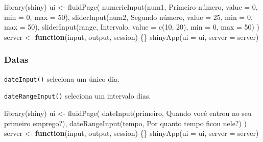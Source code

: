 \documentclass[
]{book}
\newenvironment{Shaded}{\begin{snugshade}}{\end{snugshade}}
\newcommand{\AttributeTok}[1]{\textcolor[rgb]{0.77,0.63,0.00}{#1}}
\newcommand{\ControlFlowTok}[1]{\textcolor[rgb]{0.13,0.29,0.53}{\textbf{#1}}}
\newcommand{\DecValTok}[1]{\textcolor[rgb]{0.00,0.00,0.81}{#1}}
\newcommand{\FunctionTok}[1]{\textcolor[rgb]{0.00,0.00,0.00}{#1}}
\newcommand{\NormalTok}[1]{#1}
\newcommand{\OtherTok}[1]{\textcolor[rgb]{0.56,0.35,0.01}{#1}}
\newcommand{\StringTok}[1]{\textcolor[rgb]{0.31,0.60,0.02}{#1}}
\begin{document}
\begin{Shaded}
\begin{Highlighting}[]
\FunctionTok{library}\NormalTok{(shiny)}
\NormalTok{ui }\OtherTok{\textless{}{-}} \FunctionTok{fluidPage}\NormalTok{(}
  \FunctionTok{numericInput}\NormalTok{(}\StringTok{\textquotesingle{}num1\textquotesingle{}}\NormalTok{, }\StringTok{\textquotesingle{}Primeiro número\textquotesingle{}}\NormalTok{, }\AttributeTok{value =} \DecValTok{0}\NormalTok{, }\AttributeTok{min =} \DecValTok{0}\NormalTok{, }\AttributeTok{max =} \DecValTok{50}\NormalTok{),}
  \FunctionTok{sliderInput}\NormalTok{(}\StringTok{\textquotesingle{}num2\textquotesingle{}}\NormalTok{, }\StringTok{\textquotesingle{}Segundo número\textquotesingle{}}\NormalTok{, }\AttributeTok{value =} \DecValTok{25}\NormalTok{, }\AttributeTok{min =} \DecValTok{0}\NormalTok{, }\AttributeTok{max =} \DecValTok{50}\NormalTok{),}
  \FunctionTok{sliderInput}\NormalTok{(}\StringTok{\textquotesingle{}range\textquotesingle{}}\NormalTok{, }\StringTok{\textquotesingle{}Intervalo\textquotesingle{}}\NormalTok{, }\AttributeTok{value =} \FunctionTok{c}\NormalTok{(}\DecValTok{10}\NormalTok{, }\DecValTok{20}\NormalTok{), }\AttributeTok{min =} \DecValTok{0}\NormalTok{, }\AttributeTok{max =} \DecValTok{50}\NormalTok{)}
\NormalTok{)}
\NormalTok{server }\OtherTok{\textless{}{-}} \ControlFlowTok{function}\NormalTok{(input, output, session) \{\}}
\FunctionTok{shinyApp}\NormalTok{(}\AttributeTok{ui =}\NormalTok{ ui, }\AttributeTok{server =}\NormalTok{ server)}
\end{Highlighting}
\end{Shaded}

\hypertarget{datas}{%
\subsubsection{\texorpdfstring{\textbf{Datas}}{Datas}}\label{datas}}

\texttt{dateInput()} seleciona um único dia.

\texttt{dateRangeInput()} seleciona um intervalo dias.

\begin{Shaded}
\begin{Highlighting}[]
\FunctionTok{library}\NormalTok{(shiny)}
\NormalTok{ui }\OtherTok{\textless{}{-}} \FunctionTok{fluidPage}\NormalTok{(}
  \FunctionTok{dateInput}\NormalTok{(}\StringTok{\textquotesingle{}primeiro\textquotesingle{}}\NormalTok{, }\StringTok{\textquotesingle{}Quando você entrou no seu primeiro emprego?\textquotesingle{}}\NormalTok{),}
  \FunctionTok{dateRangeInput}\NormalTok{(}\StringTok{\textquotesingle{}tempo\textquotesingle{}}\NormalTok{, }\StringTok{\textquotesingle{}Por quanto tempo ficou nele?\textquotesingle{}}\NormalTok{)}
\NormalTok{)}
\NormalTok{server }\OtherTok{\textless{}{-}} \ControlFlowTok{function}\NormalTok{(input, output, session) \{\}}
\FunctionTok{shinyApp}\NormalTok{(}\AttributeTok{ui =}\NormalTok{ ui, }\AttributeTok{server =}\NormalTok{ server)}
\end{Highlighting}
\end{Shaded}
\end{document}
